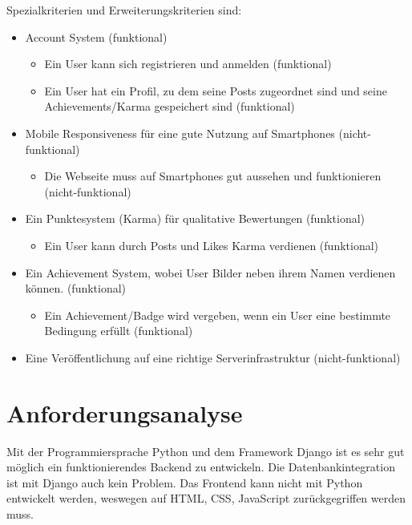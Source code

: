 Spezialkriterien und Erweiterungskriterien sind:
\begin{itemize}
    \item Account System (funktional)
    \begin{itemize}
        \item Ein User kann sich registrieren und anmelden (funktional)
        \item Ein User hat ein Profil, zu dem seine Posts zugeordnet sind und seine Achievements/Karma gespeichert sind (funktional)
    \end{itemize} 
    \item Mobile Responsiveness für eine gute Nutzung auf Smartphones (nicht-funktional)
    \begin{itemize}
        \item Die Webseite muss auf Smartphones gut aussehen und funktionieren (nicht-funktional)
    \end{itemize}
    \item Ein Punktesystem (Karma) für qualitative Bewertungen (funktional)
    \begin{itemize}
        \item Ein User kann durch Posts und Likes Karma verdienen (funktional)
    \end{itemize}
    \item Ein Achievement System, wobei User Bilder neben ihrem Namen verdienen können. (funktional)
    \begin{itemize}
        \item Ein Achievement/Badge wird vergeben, wenn ein User eine bestimmte Bedingung erfüllt (funktional)
    \end{itemize}
    \item Eine Veröffentlichung auf eine richtige Serverinfrastruktur (nicht-funktional)
\end{itemize}

\section{Anforderungsanalyse} \label{sec:anforderungsanalyse}

Mit der Programmiersprache Python und dem Framework Django ist es sehr gut
möglich ein funktionierendes Backend zu entwickeln. Die Datenbankintegration ist
mit Django auch kein Problem. Das Frontend kann nicht mit Python entwickelt
werden, weswegen auf HTML, CSS, JavaScript zurückgegriffen werden muss.
